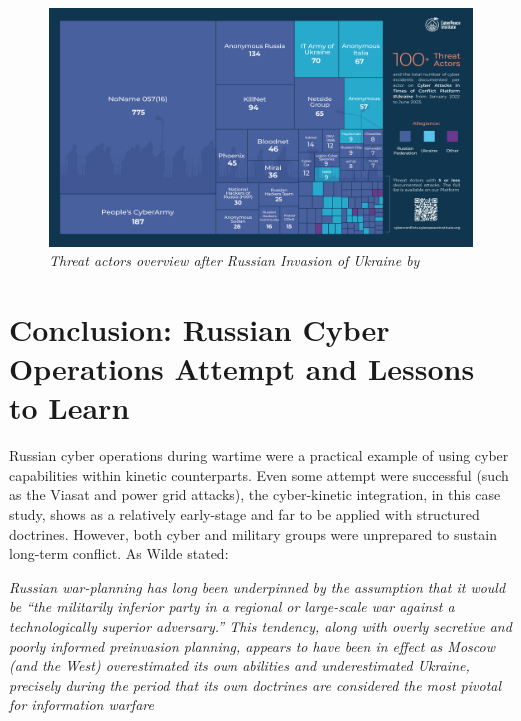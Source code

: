\begin{figure}[H]
\centering
\includegraphics[width=1\textwidth]{Images/actors.png}
\caption{\textit{Threat actors overview after Russian Invasion of Ukraine by \textcite{cyberpeaceinstitute_2023_cyber}}}
\label{actors.png}
\end{figure}


\section{Conclusion: Russian Cyber Operations Attempt and Lessons to Learn}

Russian cyber operations during wartime were a practical example of using cyber capabilities within kinetic counterparts. Even some attempt were successful (such as the Viasat and power grid attacks), the cyber-kinetic integration, in this case study, shows as a relatively early-stage and far to be applied with structured doctrines. However, both cyber and military groups were unprepared to sustain long-term conflict. As Wilde stated:

\textit{Russian war-planning has long been underpinned by the assumption that it would be “the militarily inferior party in a regional or large-scale war against a technologically superior adversary.”  This tendency, along with overly secretive and poorly informed preinvasion planning, appears to have been in effect as Moscow (and the West) overestimated its own abilities and underestimated Ukraine, precisely during the period that its own doctrines are considered the most pivotal for information warfare \autocite{wilde_2022_cyber}}

